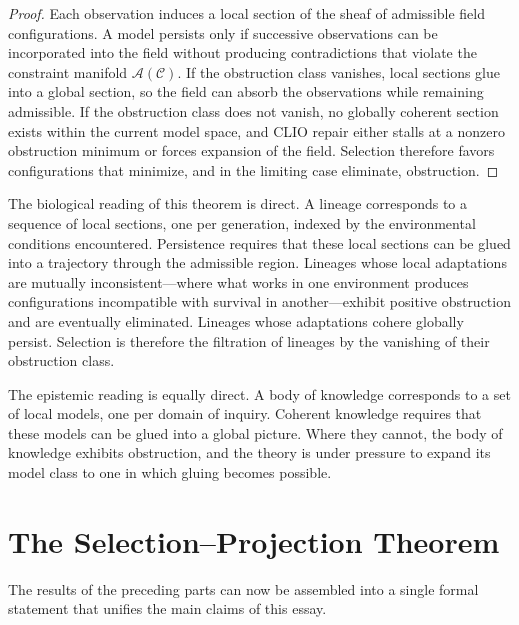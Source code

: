 \documentclass[12pt, a4paper, oneside]{article}
\theoremstyle{plain}
\theoremstyle{definition}
\theoremstyle{remark}
\newcommand{\C}{\mathcal{C}}
\newcommand{\A}{\mathcal{A}}
\begin{document}
\begin{proof}
Each observation induces a local section of the sheaf of admissible field configurations. A model persists only if successive observations can be incorporated into the field without producing contradictions that violate the constraint manifold $\A(\C)$. If the obstruction class vanishes, local sections glue into a global section, so the field can absorb the observations while remaining admissible. If the obstruction class does not vanish, no globally coherent section exists within the current model space, and CLIO repair either stalls at a nonzero obstruction minimum or forces expansion of the field. Selection therefore favors configurations that minimize, and in the limiting case eliminate, obstruction.
\end{proof}

The biological reading of this theorem is direct. A lineage corresponds to a sequence of local sections, one per generation, indexed by the environmental conditions encountered. Persistence requires that these local sections can be glued into a trajectory through the admissible region. Lineages whose local adaptations are mutually inconsistent---where what works in one environment produces configurations incompatible with survival in another---exhibit positive obstruction and are eventually eliminated. Lineages whose adaptations cohere globally persist. Selection is therefore the filtration of lineages by the vanishing of their obstruction class.

The epistemic reading is equally direct. A body of knowledge corresponds to a set of local models, one per domain of inquiry. Coherent knowledge requires that these models can be glued into a global picture. Where they cannot, the body of knowledge exhibits obstruction, and the theory is under pressure to expand its model class to one in which gluing becomes possible.

\section{The Selection--Projection Theorem}

The results of the preceding parts can now be assembled into a single formal statement that unifies the main claims of this essay.
\end{document}
